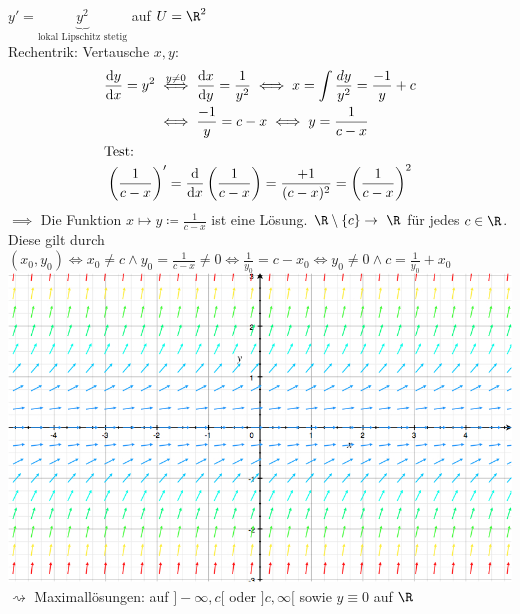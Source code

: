 \begin{bsp}
	$y' = \underbrace{y^2}_{\text{lokal Lipschitz stetig}}$ auf $U = \R^2$ \\
	Rechentrik: Vertausche $x , y$:
	\begin{gather*}
		\begin{split}
			\frac{\dd y}{\dd x} = y^2	&\overset{y \neq 0}{\iff} \frac{\dd x}{\dd y} = \frac{1}{y^2} \iff x = \int \frac{dy}{y^2} = \frac{-1}{y} + c \\
							&\iff \frac{-1}{y} = c - x \iff y = \frac{1}{c - x}
		\end{split} \\
		\intertext{Test:}
		\left( \frac{1}{c - x} \right)' = \frac{\dd}{\dd x} \left( \frac{1}{c - x} \right) = \frac{+1}{(c-x)^2} = \left( \frac{1}{c - x} \right)^2
	\end{gather*}
	$\implies$ Die Funktion $x \mapsto y \coloneqq \frac{1}{c - x}$ ist eine Lösung. $\R \setminus \{c\} \rightarrow \R$ für jedes $c \in \R$. \\
	Diese gilt durch $(x_0 , y_0) \iff x_0 \neq c \wedge y_0 = \frac{1}{c - x} \neq 0 \iff \frac{1}{y_0} = c - x_0 \iff y_0 \neq 0 \wedge c = \frac{1}{y_0} + x_0$ \\
	\includegraphics[width=\textwidth]{Bild2}
	$\rightsquigarrow$ Maximallösungen: auf $]-\infty , c[$ oder $] c , \infty [$ sowie $y \equiv 0$ auf $\R$
\end{bsp}
